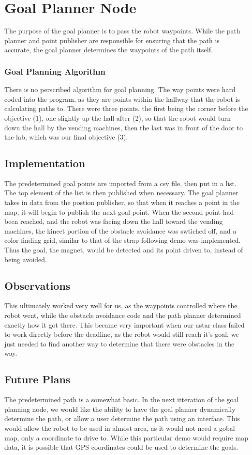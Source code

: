 \section{Goal Planner Node}
The purpose of the goal planner is to pass the robot waypoints. While the path planner and point publisher are responsible for ensuring that the path is accurate, the goal planner determines the waypoints of the path itself. 

\subsubsection{Goal Planning Algorithm}
There is no perscribed algorithm for goal planning. The way points were hard coded into the program, as they are points within the hallway that the robot is calculating paths to. There were three points, the first being the corner before the objective (1), one slightly up the hall after (2), so that the robot would turn down the hall by the vending machines, then the last was in front of the door to the lab, which was our final objective (3).

\subsection{Implementation}
The predetermined goal points are imported from a csv file, then put in a list. The top element of the list is then published when necessary. The goal planner takes in data from the postion publisher, so that when it reaches a point in the map, it will begin to publish the next goal point. When the second point had been reached, and the robot was facing down the hall toward the vending machines, the kinect portion of the obstacle avoidance was swtiched off, and a color finding grid, similar to that of the strap following demo was implemented. Thus the goal, the magnet, would be detected and its point driven to, instead of being avoided.

\subsection{Observations}
This ultimately worked very well for us, as the waypoints controlled where the robot went, while the obstacle avoidance code and the path planner determined exactly how it got there. This became very important when our astar class failed to work directly before the deadline, as the robot would still reach it's goal, we just needed to find another way to determine that there were obstacles in the way.

\subsection{Future Plans}
The predetermined path is a somewhat basic. In the next itteration of the goal planning node, we would like the ability to have the goal planner dynamically determine the path, or allow a user determine the path using an interface. This would allow the robot to be used in almost area, as it would not need a gobal map, only a coordinate to drive to. While this particular demo would require map data, it is possible that GPS coordinates could be used to determine the goals.